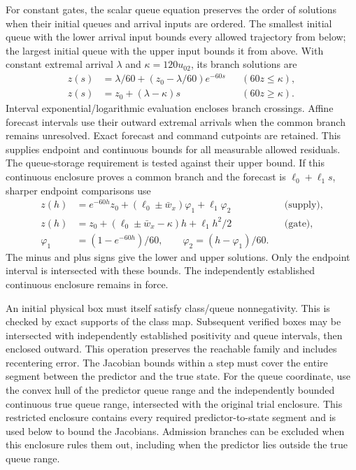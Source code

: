\documentclass[preprint,12pt]{elsarticle}
\begin{document}
For constant gates, the scalar queue equation preserves the order of
solutions when their initial queues and arrival inputs are ordered. The
smallest initial queue with the lower arrival input bounds every allowed
trajectory from below; the largest initial queue with the upper input
bounds it from above. With constant extremal arrival $\lambda$ and
$\kappa=120u_{02}$, its branch solutions are
\begin{equation}
 \begin{aligned}
 z(s)&=\lambda/60+(z_0-\lambda/60)e^{-60s}
                    &&(60z\le \kappa),\\
 z(s)&=z_0+(\lambda-\kappa)s &&(60z\ge \kappa).
 \end{aligned}
 \label{eq:structure-queue-flows}
\end{equation}
Interval exponential/logarithmic evaluation encloses branch crossings.
Affine forecast intervals use their outward extremal arrivals when the common
branch remains unresolved. Exact forecast and command cutpoints are retained.
This supplies endpoint and continuous bounds for all measurable allowed
residuals. The queue-storage requirement is tested against their upper bound.
If this continuous enclosure proves a common branch and the forecast is
$\ell_0+\ell_1s$, sharper endpoint comparisons use
\begin{equation}
\begin{aligned}
 z(h)&=e^{-60h}z_0+(\ell_0\pm\bar w_x)\varphi_1+\ell_1\varphi_2
       &&\text{(supply)},\\
 z(h)&=z_0+(\ell_0\pm\bar w_x-\kappa)h+\ell_1h^2/2
       &&\text{(gate)},\\
 \varphi_1&=(1-e^{-60h})/60,\qquad
 \varphi_2=(h-\varphi_1)/60.
\end{aligned}
\end{equation}
The minus and plus signs give the lower and upper solutions. Only the
endpoint interval is intersected with these bounds. The independently
established continuous enclosure remains in force.

An initial physical box must itself satisfy class/queue nonnegativity. This
is checked by exact supports of the class map. Subsequent verified boxes may
be intersected with independently established positivity and queue intervals,
then enclosed outward. This operation preserves the reachable family and
includes recentering error. The Jacobian bounds within a step must cover the entire segment between
the predictor and the true state. For the queue coordinate, use the convex
hull of the predictor queue range and the independently bounded continuous
true queue range, intersected with the original trial enclosure. This
restricted enclosure contains every required predictor-to-state segment
and is used below to bound the Jacobians. Admission branches
can be excluded when this enclosure rules them out, including when the
predictor lies outside the true queue range.
\end{document}
